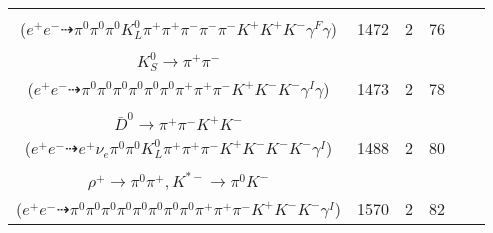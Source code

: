 \documentclass[landscape]{article}
\newcounter{rownumbers}
\newcommand\rn{\stepcounter{rownumbers}\arabic{rownumbers}}
\newcommand{\EOLP}{\\ \hline} %
\newcommand{\topoTags}[1]{#1} %
\begin{document}
\begin{longtable}{clcccc}
\rn & \makecell[l]{ $ 
e^{+} e^{-} \rightarrow \pi^{+} \pi^{-} \omega K^{+} D^{*0} D_{s}^{*-} ,
\omega \rightarrow \pi^{0} \pi^{+} \pi^{-} ,
D^{*0} \rightarrow \pi^{0} D^{0} ,
D_{s}^{*-} \rightarrow D_{s}^{-} \gamma ,
D^{0} \rightarrow \pi^{0} K_{L}^{0} ,
D_{s}^{-} \rightarrow \pi^{-} K^{+} K^{-} \gamma^{F} 
$ \\ ($
e^{+} e^{-} \dashrightarrow \pi^{0} \pi^{0} \pi^{0} K_{L}^{0} \pi^{+} \pi^{+} \pi^{-} \pi^{-} \pi^{-} K^{+} K^{+} K^{-} \gamma^{F} \gamma 
$) } & \topoTags{1472 & }2 & 76 \EOLP

\rn & \makecell[l]{ $ 
e^{+} e^{-} \rightarrow \pi^{0} \pi^{0} K^{+} K^{-} D^{0} \bar{D}^{*0} \gamma^{I} ,
D^{0} \rightarrow \rho^{+} K^{*-} ,
\bar{D}^{*0} \rightarrow \bar{D}^{0} \gamma ,
\rho^{+} \rightarrow \pi^{0} \pi^{+} ,
K^{*-} \rightarrow \pi^{0} K^{-} ,
\bar{D}^{0} \rightarrow \pi^{0} \pi^{0} K_{S}^{0} ,
$ \\ $
K_{S}^{0} \rightarrow \pi^{+} \pi^{-} 
$ \\ ($
e^{+} e^{-} \dashrightarrow \pi^{0} \pi^{0} \pi^{0} \pi^{0} \pi^{0} \pi^{0} \pi^{+} \pi^{+} \pi^{-} K^{+} K^{-} K^{-} \gamma^{I} \gamma 
$) } & \topoTags{1473 & }2 & 78 \EOLP

\rn & \makecell[l]{ $ 
e^{+} e^{-} \rightarrow K^{0} K^{*-} D^{*+} \bar{D}^{*0} \gamma^{I} ,
K^{0} \rightarrow K_{L}^{0} ,
K^{*-} \rightarrow \pi^{0} K^{-} ,
D^{*+} \rightarrow \pi^{+} D^{0} ,
\bar{D}^{*0} \rightarrow \pi^{0} \bar{D}^{0} ,
D^{0} \rightarrow e^{+} \nu_{e} K^{-} ,
$ \\ $
\bar{D}^{0} \rightarrow \pi^{+} \pi^{-} K^{+} K^{-} 
$ \\ ($
e^{+} e^{-} \dashrightarrow e^{+} \nu_{e} \pi^{0} \pi^{0} K_{L}^{0} \pi^{+} \pi^{+} \pi^{-} K^{+} K^{-} K^{-} K^{-} \gamma^{I} 
$) } & \topoTags{1488 & }2 & 80 \EOLP

\rn & \makecell[l]{ $ 
e^{+} e^{-} \rightarrow \pi^{0} \pi^{0} \pi^{+} D^{*-} D^{*0} \gamma^{I} ,
D^{*-} \rightarrow \pi^{-} \bar{D}^{0} ,
D^{*0} \rightarrow \pi^{0} D^{0} ,
\bar{D}^{0} \rightarrow K_{L}^{0} K^{+} K^{-} ,
D^{0} \rightarrow \rho^{+} K^{*-} ,
K_{L}^{0} \rightarrow \pi^{0} \pi^{0} \pi^{0} ,
$ \\ $
\rho^{+} \rightarrow \pi^{0} \pi^{+} ,
K^{*-} \rightarrow \pi^{0} K^{-} 
$ \\ ($
e^{+} e^{-} \dashrightarrow \pi^{0} \pi^{0} \pi^{0} \pi^{0} \pi^{0} \pi^{0} \pi^{0} \pi^{0} \pi^{+} \pi^{+} \pi^{-} K^{+} K^{-} K^{-} \gamma^{I} 
$) } & \topoTags{1570 & }2 & 82 \EOLP


\end{longtable}
\end{document}
